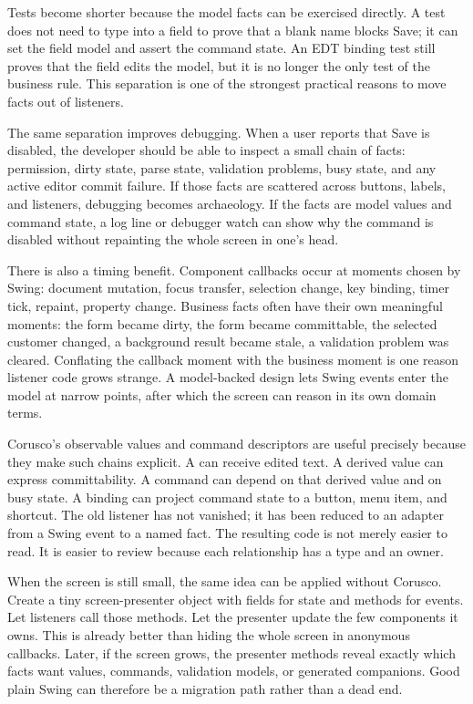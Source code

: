 Tests become shorter because the model facts can be exercised directly. A test
does not need to type into a field to prove that a blank name blocks Save; it
can set the field model and assert the command state. An EDT binding test still
proves that the field edits the model, but it is no longer the only test of the
business rule. This separation is one of the strongest practical reasons to
move facts out of listeners.

The same separation improves debugging. When a user reports that Save is
disabled, the developer should be able to inspect a small chain of facts:
permission, dirty state, parse state, validation problems, busy state, and any
active editor commit failure. If those facts are scattered across buttons,
labels, and listeners, debugging becomes archaeology. If the facts are model
values and command state, a log line or debugger watch can show why the command
is disabled without repainting the whole screen in one's head.

There is also a timing benefit. Component callbacks occur at moments chosen by
Swing: document mutation, focus transfer, selection change, key binding,
timer tick, repaint, property change. Business facts often have their own
meaningful moments: the form became dirty, the form became committable, the
selected customer changed, a background result became stale, a validation
problem was cleared. Conflating the callback moment with the business moment is
one reason listener code grows strange. A model-backed design lets Swing events
enter the model at narrow points, after which the screen can reason in its own
domain terms.

Corusco's observable values and command descriptors are useful precisely
because they make such chains explicit. A  can receive
edited text. A derived value can express committability. A command can depend
on that derived value and on busy state. A binding can project command state to
a button, menu item, and shortcut. The old listener has not vanished; it has
been reduced to an adapter from a Swing event to a named fact. The resulting
code is not merely easier to read. It is easier to review because each
relationship has a type and an owner.

When the screen is still small, the same idea can be applied without Corusco.
Create a tiny screen-presenter object with fields for state and methods for events.
Let listeners call those methods. Let the presenter update the few components it
owns. This is already better than hiding the whole screen in anonymous
callbacks. Later, if the screen grows, the presenter methods reveal exactly
which facts want values, commands, validation models, or generated companions.
Good plain Swing can therefore be a migration path rather than a dead end.

